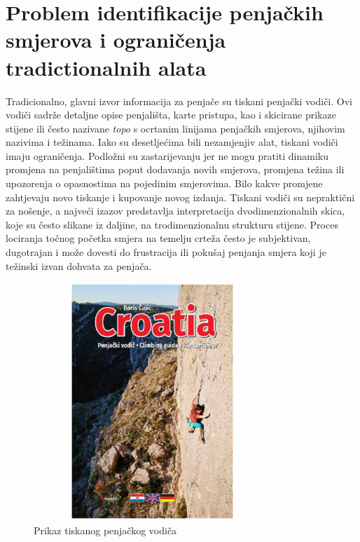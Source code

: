 \section{Problem identifikacije penjačkih smjerova i ograničenja tradictionalnih alata}

Tradicionalno, glavni izvor informacija za penjače su tiskani penjački vodiči. Ovi vodiči sadrže detaljne opise penjališta, karte pristupa, kao i skicirane prikaze stijene ili često nazivane \textit{topo} s ocrtanim linijama penjačkih smjerova, njihovim nazivima i težinama. Iako su desetljećima bili nezamjenjiv alat, tiskani vodiči imaju ograničenja. Podložni su zastarijevanju jer ne mogu pratiti dinamiku promjena na penjalištima poput dodavanja novih smjerova, promjena težina ili upozorenja o opasnostima na pojedinim smjerovima. Bilo kakve promjene zahtjevaju novo tiskanje i kupovanje novog izdanja. Tiskani vodiči su nepraktični za nošenje, a najveći izazov predstavlja interpretacija dvodimenzionalnih skica, koje su često slikane iz daljine, na trodimenzionalnu strukturu stijene. Proces lociranja točnog početka smjera na temelju crteža često je subjektivan, dugotrajan i može dovesti do frustracija ili pokušaj penjanja smjera koji je težinski izvan dohvata za penjača. 

\begin{figure}[H]
    \centering
    \includegraphics[width=0.8\textwidth]{images/uvod/tradicionalni_vodic.jpg}
    \caption{Prikaz tiskanog penjačkog vodiča}
\end{figure} 
